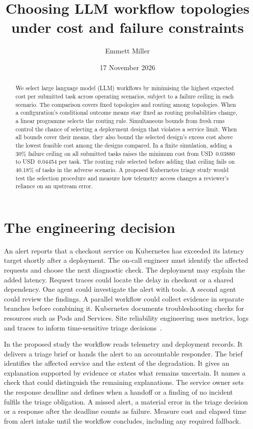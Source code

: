 \documentclass[11pt,reqno]{amsart}
\title[Choosing LLM workflow topologies]{Choosing LLM workflow topologies under cost and failure constraints}
\author{Emmett Miller}
\date{17 November 2026}
\theoremstyle{definition}
\theoremstyle{remark}
\begin{document}
\begin{abstract}
We select large language model (LLM) workflows by minimising the highest expected cost per submitted task across operating scenarios, subject to a failure ceiling in each scenario. The comparison covers fixed topologies and routing among topologies.
When a configuration's conditional outcome means stay fixed as routing probabilities change, a linear programme selects the routing rule. Simultaneous bounds from fresh runs control the chance of selecting a deployment design that violates a service limit. When all bounds cover their means, they also bound the selected design's excess cost above the lowest feasible cost among the designs compared.
In a finite simulation, adding a 30\% failure ceiling on all submitted tasks raises the minimum cost from USD~0.03880 to USD~0.04454 per task. The routing rule selected before adding that ceiling fails on 40.18\% of tasks in the adverse scenario.
A proposed Kubernetes triage study would test the selection procedure and measure how telemetry access changes a reviewer's reliance on an upstream error.
\end{abstract}
\maketitle

\section{The engineering decision}
An alert reports that a checkout service on Kubernetes has exceeded its latency target shortly after a deployment.
The on-call engineer must identify the affected requests and choose the next diagnostic check.
The deployment may explain the added latency. Request traces could locate the delay in checkout or a shared dependency.
One agent could investigate the alert with tools. A second agent could review the findings. A parallel workflow could collect evidence in separate branches before combining it.
Kubernetes documents troubleshooting checks for resources such as Pods and Services. Site reliability engineering uses metrics, logs and traces to inform time-sensitive triage decisions~\cite{sreTroubleshooting2016,kubernetesTroubleshootingApplications}.

In the proposed study the workflow reads telemetry and deployment records. It delivers a triage brief or hands the alert to an accountable responder.
The brief identifies the affected service and the extent of the degradation. It gives an explanation supported by evidence or states what remains uncertain. It names a check that could distinguish the remaining explanations.
The service owner sets the response deadline and defines when a handoff or a finding of no incident fulfils the triage obligation.
A missed alert, a material error in the triage decision or a response after the deadline counts as failure.
Measure cost and elapsed time from alert intake until the workflow concludes, including any required fallback.
\end{document}
